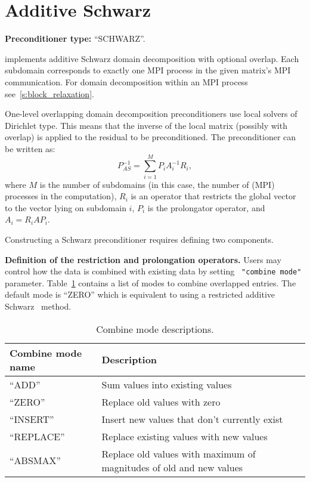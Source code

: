 \section{Additive Schwarz}\label{s:schwarz}

\textbf{Preconditioner type:} ``SCHWARZ''.

\ifpacktwo{} implements additive Schwarz domain decomposition with optional
overlap. Each subdomain corresponds to exactly one MPI process in the given
matrix's MPI communication. For domain decomposition within an
MPI process see~\ref{s:block_relaxation}.

One-level overlapping domain decomposition preconditioners use local solvers of
Dirichlet type. This means that the inverse of the local matrix (possibly with
overlap) is applied to the residual to be preconditioned. The preconditioner can
be written as:
$$ P_{AS}^{-1} = \sum_{i=1}^M P_i A_i^{-1} R_i, $$
where $M$ is the number of subdomains (in this case, the number of (MPI)
processes in the computation), $R_i$ is an operator that restricts the global
vector to the vector lying on subdomain $i$, $P_i$ is the prolongator
operator, and $A_i = R_i A P_i$.

Constructing a Schwarz preconditioner requires defining two components.

{\bf Definition of the restriction and prolongation operators.}
Users may control how the data is combined with existing data by setting {\tt
"combine mode"} parameter. Table~\ref{t:combine_mode} contains a list of modes to
combine overlapped entries. The default mode is ``ZERO'' which is equivalent to
using a restricted additive Schwarz~\cite{Cai1999} method.

\begin{table}[htbp]
  \centering
  \begin{tabular}{p{3.5cm} p{12.0cm}}
    \toprule
    Combine mode name & Description \\
    \midrule
    ``ADD''           & Sum values into existing values \\
    ``ZERO''          & Replace old values with zero \\
    ``INSERT''        & Insert new values that don't currently exist \\
    ``REPLACE''       & Replace existing values with new values \\
    ``ABSMAX''        & Replace old values with maximum of magnitudes of old and new values \\
    \bottomrule
  \end{tabular}
  \caption{\label{t:combine_mode}Combine mode descriptions.}
\end{table}

